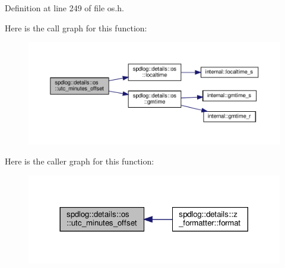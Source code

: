 Definition at line 249 of file os.\+h.

Here is the call graph for this function\+:
\nopagebreak
\begin{figure}[H]
\begin{center}
\leavevmode
\includegraphics[width=350pt]{namespacespdlog_1_1details_1_1os_a6dce662c3a4ea0b6e95468272ec37047_cgraph}
\end{center}
\end{figure}
Here is the caller graph for this function\+:
\nopagebreak
\begin{figure}[H]
\begin{center}
\leavevmode
\includegraphics[width=317pt]{namespacespdlog_1_1details_1_1os_a6dce662c3a4ea0b6e95468272ec37047_icgraph}
\end{center}
\end{figure}
